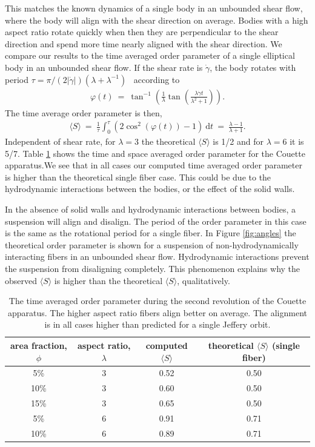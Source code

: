 \documentclass[AMA,STIX1COL]{WileyNJD-v2}
\begin{document}
This matches the known dynamics of a single body in an unbounded shear
flow, where the body will align with the shear direction on average.
Bodies with a high aspect ratio rotate quickly when then they are
perpendicular to the shear direction and spend more time nearly aligned
with the shear direction. We compare our results to the time averaged
order parameter of a single elliptical body in an unbounded shear flow.
If the shear rate is $\dot{\gamma}$, the body rotates with period $\tau
= \pi/(2| \dot{\gamma}|)(\lambda + \lambda^{-1})$~\cite{Jeffery1922}
according to 
\begin{align*}
  \varphi(t) ~=~ \tan^{-1}\left(\frac{1}{\lambda}\tan\left(
    \frac{\lambda \dot{\gamma}t}{\lambda^2 + 1}\right)\right).
\end{align*}
The time average order parameter is then,
\begin{align*}
  \langle S\rangle ~=~ \frac{1}{\tau}\int_0^\tau\left( 
    2\cos^2(\varphi(t)) - 1\right)~\text{d}t ~=~ \frac{\lambda -1}{\lambda+1}.
\end{align*}
Independent of shear rate, for $\lambda= 3$ the theoretical $\langle
S\rangle$ is 1/2 and for $\lambda=6$ it is  5/7. Table \ref{tab:order}
shows the time and space averaged order parameter for the Couette
apparatus.We see that in all cases our computed time averaged order
parameter is higher than the theoretical single fiber case. This could
be due to the hydrodynamic interactions between the bodies, or the
effect of the solid walls.

In the absence of solid walls and hydrodynamic interactions between
bodies, a suspension will align and disalign. The period of the order
parameter in this case is the same as the rotational period for a single
fiber. In Figure \ref{fig:angles} the theoretical order parameter is
shown for a suspension of non-hydrodynamically interacting fibers in an
unbounded shear flow.  Hydrodynamic interactions prevent the suspension
from disaligning completely. This phenomenon explains why the observed
$\langle S\rangle$ is higher than the theoretical $\langle S\rangle$,
qualitatively.

\begin{table}[t]
  \centering
  \caption{The time averaged order parameter during the second
  revolution of the Couette apparatus. The higher aspect ratio fibers
  align better on average. The alignment is in all cases higher than
predicted for a single Jeffery orbit. \label{tab:order}}
\begin{tabular*}{500pt}{@{\extracolsep\fill}cccc@{\extracolsep\fill}}
    \toprule
area fraction, $\phi$ & aspect ratio, $\lambda$ & computed $ \langle S \rangle$ & theoretical
$\langle S \rangle$ (single fiber)\\
\midrule
5\%  & 3 & 0.52 & 0.50 \\
10\% & 3 & 0.60 & 0.50 \\
15\% & 3 & 0.65 & 0.50 \\
5\%  & 6 & 0.91 & 0.71 \\
10\% & 6 & 0.89 & 0.71 \\
\bottomrule
\end{tabular*}
\end{table} 
\end{document}
